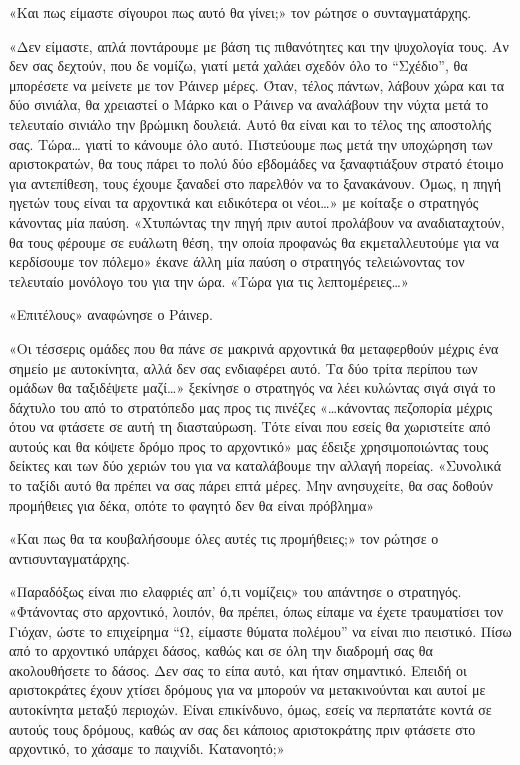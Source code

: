 \documentclass[12pt,twoside, openany]{book}
\begin{document}
«Και πως είμαστε σίγουροι πως αυτό θα γίνει;» τον ρώτησε ο συνταγματάρχης.

«Δεν είμαστε, απλά ποντάρουμε με βάση τις πιθανότητες και την ψυχολογία τους. Αν δεν σας δεχτούν, που δε νομίζω, γιατί μετά χαλάει σχεδόν όλο το “Σχέδιο”, θα μπορέσετε να μείνετε με τον Ράινερ μέρες. Όταν, τέλος πάντων, λάβουν χώρα και τα δύο σινιάλα, θα χρειαστεί ο Μάρκο και ο Ράινερ να αναλάβουν την νύχτα μετά το τελευταίο σινιάλο την βρώμικη δουλειά. Αυτό θα είναι και το τέλος της αποστολής σας. Τώρα… γιατί το κάνουμε όλο αυτό. Πιστεύουμε πως μετά την υποχώρηση των αριστοκρατών, θα τους πάρει το πολύ δύο εβδομάδες να ξαναφτιάξουν στρατό έτοιμο για αντεπίθεση, τους έχουμε ξαναδεί στο παρελθόν να το ξανακάνουν. Όμως, η πηγή ηγετών τους είναι τα αρχοντικά και ειδικότερα οι νέοι…» με κοίταξε ο στρατηγός κάνοντας μία παύση. «Χτυπώντας την πηγή πριν αυτοί προλάβουν να αναδιαταχτούν, θα τους φέρουμε σε ευάλωτη θέση, την οποία προφανώς θα εκμεταλλευτούμε για να κερδίσουμε τον πόλεμο» έκανε άλλη μία παύση ο στρατηγός τελειώνοντας τον τελευταίο μονόλογο του για την ώρα. «Τώρα για τις λεπτομέρειες…»

«Επιτέλους» αναφώνησε ο Ράινερ.

«Οι τέσσερις ομάδες που θα πάνε σε μακρινά αρχοντικά θα μεταφερθούν μέχρις ένα σημείο με αυτοκίνητα, αλλά δεν σας ενδιαφέρει αυτό. Τα δύο τρίτα περίπου των ομάδων θα ταξιδέψετε μαζί…» ξεκίνησε ο στρατηγός να λέει κυλώντας σιγά σιγά το δάχτυλο του από το στρατόπεδο μας προς τις πινέζες «…κάνοντας πεζοπορία μέχρις ότου να φτάσετε σε αυτή τη διασταύρωση. Τότε είναι που εσείς θα χωριστείτε από αυτούς και θα κόψετε δρόμο προς το αρχοντικό» μας έδειξε χρησιμοποιώντας τους δείκτες και των δύο χεριών του για να καταλάβουμε την αλλαγή πορείας. «Συνολικά το ταξίδι αυτό θα πρέπει να σας πάρει επτά μέρες. Μην ανησυχείτε, θα σας δοθούν προμήθειες για δέκα, οπότε το φαγητό δεν θα είναι πρόβλημα»

«Και πως θα τα κουβαλήσουμε όλες αυτές τις προμήθειες;» τον ρώτησε ο αντισυνταγματάρχης.

«Παραδόξως είναι πιο ελαφριές απ’ ό,τι νομίζεις» του απάντησε ο στρατηγός. «Φτάνοντας στο αρχοντικό, λοιπόν, θα πρέπει, όπως είπαμε να έχετε τραυματίσει τον Γιόχαν, ώστε το επιχείρημα “Ω, είμαστε θύματα πολέμου” να είναι πιο πειστικό. Πίσω από το αρχοντικό υπάρχει δάσος, καθώς και σε όλη την διαδρομή σας θα ακολουθήσετε το δάσος. Δεν σας το είπα αυτό, και ήταν σημαντικό. Επειδή οι αριστοκράτες έχουν χτίσει δρόμους για να μπορούν να μετακινούνται και αυτοί με αυτοκίνητα μεταξύ περιοχών. Είναι επικίνδυνο, όμως, εσείς να περπατάτε κοντά σε αυτούς τους δρόμους, καθώς αν σας δει κάποιος αριστοκράτης πριν φτάσετε στο αρχοντικό, το χάσαμε το παιχνίδι. Κατανοητό;»
\end{document}

